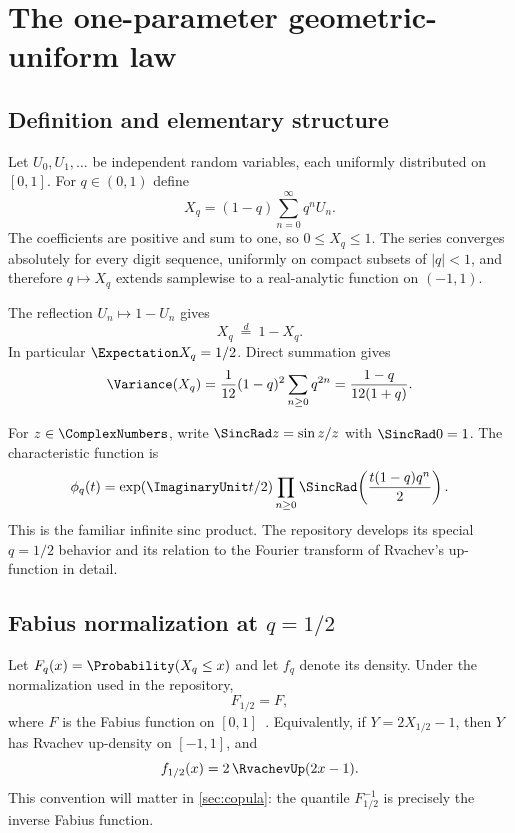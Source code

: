 \documentclass[11pt,a4paper]{article}
\theoremstyle{definition}
\theoremstyle{remark}
\begin{document}
\section{The one-parameter geometric-uniform law}
\label{sec:oneparameter}

\subsection{Definition and elementary structure}

Let $U_0,U_1,\ldots$ be independent random variables, each uniformly distributed on $[0,1]$.  For $q\in(0,1)$ define
\begin{equation}
  X_q=(1-q)\sum_{n=0}^{\infty}q^nU_n.
  \label{eq:Xq}
\end{equation}
The coefficients are positive and sum to one, so $0\le X_q\le1$.  The series converges absolutely for every digit sequence, uniformly on compact subsets of $|q|<1$, and therefore $q\mapsto X_q$ extends samplewise to a real-analytic function on $(-1,1)$.

The reflection $U_n\mapsto1-U_n$ gives
\begin{equation}
  X_q\ \stackrel{d}{=}\ 1-X_q.
  \label{eq:marginal-symmetry}
\end{equation}
In particular $\Expectation X_q=1/2$.  Direct summation gives
\begin{equation}
  \Variance(X_q)
   =\frac1{12}(1-q)^2\sum_{n\ge0}q^{2n}
   =\frac{1-q}{12(1+q)}.
  \label{eq:var-Xq}
\end{equation}

For $z\in\ComplexNumbers$, write $\SincRad z=\sin z/z$ with $\SincRad0=1$.  The characteristic function is
\begin{equation}
 \phi_q(t)
 =\exp(\ImaginaryUnit t/2)\prod_{n\ge0}
   \SincRad\!\left(\frac{t(1-q)q^n}{2}\right).
 \label{eq:marginal-sinc}
\end{equation}
This is the familiar infinite sinc product.  The repository develops its special $q=1/2$ behavior and its relation to the Fourier transform of Rvachev's up-function in detail.

\subsection{Fabius normalization at \texorpdfstring{$q=1/2$}{q=1/2}}

Let $F_q(x)=\Probability(X_q\le x)$ and let $f_q$ denote its density.  Under the normalization used in the repository,
\begin{equation}
  F_{1/2}=F,
\end{equation}
where $F$ is the Fabius function on $[0,1]$~\cite{Fabius1966,Arias2017,Arias2018}.  Equivalently, if $Y=2X_{1/2}-1$, then $Y$ has Rvachev up-density on $[-1,1]$, and
\begin{equation}
  f_{1/2}(x)=2\,\RvachevUp(2x-1).
\end{equation}
This convention will matter in \cref{sec:copula}: the quantile $F_{1/2}^{-1}$ is precisely the inverse Fabius function.
\end{document}
